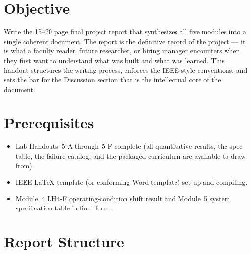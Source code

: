 \documentclass[11pt,letterpaper]{article}
\begin{document}

\section{Objective}
Write the 15--20 page final project report that synthesizes all five modules into a single coherent document. The report is the definitive record of the project --- it is what a faculty reader, future researcher, or hiring manager encounters when they first want to understand what was built and what was learned. This handout structures the writing process, enforces the IEEE style conventions, and sets the bar for the Discussion section that is the intellectual core of the document.

\section{Prerequisites}
\begin{itemize}[leftmargin=2em]
	\item Lab Handouts~5-A through~5-F complete (all quantitative results, the spec table, the failure catalog, and the packaged curriculum are available to draw from).
	\item IEEE LaTeX template (or conforming Word template) set up and compiling.
	\item Module~4 LH4-F operating-condition shift result and Module~5 system specification table in final form.
\end{itemize}

\section{Report Structure}
\end{document}
